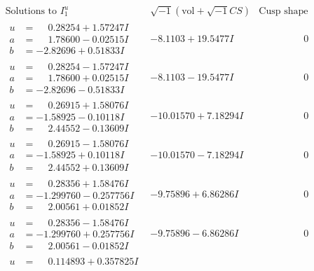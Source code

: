 \documentclass[1p]{elsarticle_modified}
\theoremstyle{definition}
\newcommand{\I}{\sqrt{-1}}
\begin{document}
$$\begin{array}{c|c|c}
\text{Solutions to }I^u_{1}& \I (\text{vol} + \sqrt{-1}CS) & \text{Cusp shape}\\
 \hline 
\begin{aligned}
u &= \phantom{-}0.28254 + 1.57247 I \\
a &= \phantom{-}1.78600 - 0.02515 I \\
b &= -2.82696 + 0.51833 I\end{aligned}
 & -8.1103 + 19.5477 I & \phantom{-0.000000 } 0 \\ \hline\begin{aligned}
u &= \phantom{-}0.28254 - 1.57247 I \\
a &= \phantom{-}1.78600 + 0.02515 I \\
b &= -2.82696 - 0.51833 I\end{aligned}
 & -8.1103 - 19.5477 I & \phantom{-0.000000 } 0 \\ \hline\begin{aligned}
u &= \phantom{-}0.26915 + 1.58076 I \\
a &= -1.58925 - 0.10118 I \\
b &= \phantom{-}2.44552 - 0.13609 I\end{aligned}
 & -10.01570 + 7.18294 I & \phantom{-0.000000 } 0 \\ \hline\begin{aligned}
u &= \phantom{-}0.26915 - 1.58076 I \\
a &= -1.58925 + 0.10118 I \\
b &= \phantom{-}2.44552 + 0.13609 I\end{aligned}
 & -10.01570 - 7.18294 I & \phantom{-0.000000 } 0 \\ \hline\begin{aligned}
u &= \phantom{-}0.28356 + 1.58476 I \\
a &= -1.299760 - 0.257756 I \\
b &= \phantom{-}2.00561 + 0.01852 I\end{aligned}
 & -9.75896 + 6.86286 I & \phantom{-0.000000 } 0 \\ \hline\begin{aligned}
u &= \phantom{-}0.28356 - 1.58476 I \\
a &= -1.299760 + 0.257756 I \\
b &= \phantom{-}2.00561 - 0.01852 I\end{aligned}
 & -9.75896 - 6.86286 I & \phantom{-0.000000 } 0 \\ \hline\begin{aligned}
u &= \phantom{-}0.114893 + 0.357825 I \\

\end{aligned}
\end{array}$$
\end{document}
